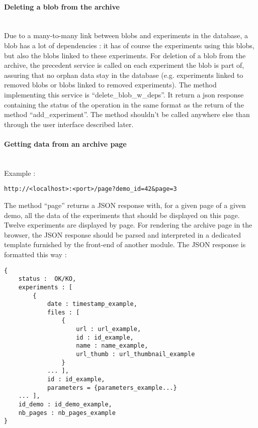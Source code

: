 \paragraph{Deleting a blob from the archive} \hspace{0pt} \\
Due to a many-to-many link between blobs and experiments in the database, a blob has a lot of dependencies : it has of course the experiments using this blobs, but also the blobs linked to these experiments. For deletion of a blob from the archive, the precedent service is called on each experiment the blob is part of, assuring that no orphan data stay in the database (e.g. experiments linked to removed blobs or blobs linked to removed experiments). The method implementing this service is ``delete\_blob\_w\_deps''. It return a json response containing the status of the operation in the same format as the return of the method ``add\_experiment''. The method shouldn't be called anywhere else than through the user interface described later.

\paragraph{Getting data  from an archive page} \hspace{0pt} \\
Example :
\begin{verbatim}
http://<localhost>:<port>/page?demo_id=42&page=3
\end{verbatim}
The method ``page'' returns a JSON response with, for a given page of a given demo, all the data of the experiments that should be displayed on this page. Twelve experiments are displayed by page. For rendering the archive page in the browser, the JSON response should be parsed and interpreted in a dedicated template furnished by the front-end of another module. The JSON response is formatted this way : 
\begin{verbatim}
{
    status :  OK/KO,
    experiments : [
        {
            date : timestamp_example, 
            files : [
                {
                    url : url_example,
                    id : id_example,
                    name : name_example,
                    url_thumb : url_thumbnail_example
                }
            ... ],
            id : id_example,
            parameters = {parameters_example...}
    ... ],
    id_demo : id_demo_example,
    nb_pages : nb_pages_example
}
\end{verbatim} 

